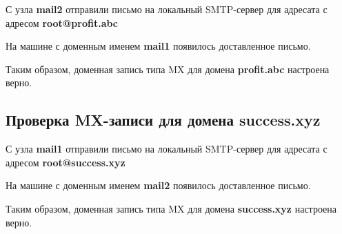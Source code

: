 \documentclass[a4paper,12pt]{article}
\begin{document}
С узла \textbf{mail2} отправили письмо на локальный SMTP-сервер для адресата с адресом \textbf{root@profit.abc}


На машине с доменным именем \textbf{mail1} появилось доставленное письмо.

Таким образом, доменная запись типа MX для домена \textbf{profit.abc} настроена верно.

\clearpage
\subsection{Проверка MX-записи для домена \textbf{success.xyz}}

С узла \textbf{mail1} отправили письмо на локальный SMTP-сервер для адресата с адресом \textbf{root@success.xyz}


На машине с доменным именем \textbf{mail2} появилось доставленное письмо.

Таким образом, доменная запись типа MX для домена \textbf{success.xyz} настроена верно.
\end{document}
